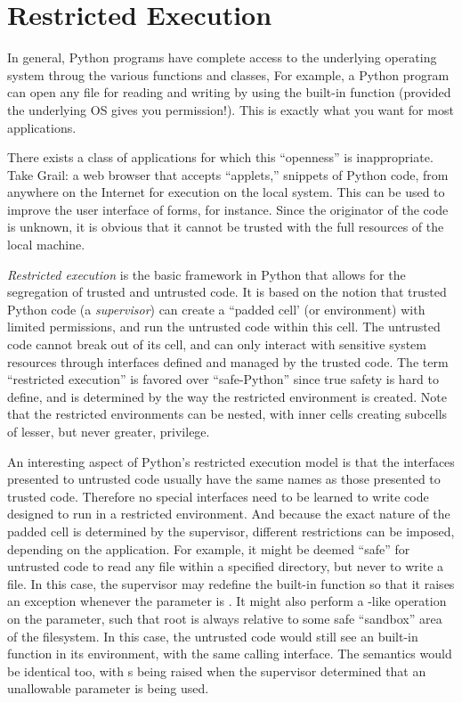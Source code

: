 \chapter{Restricted Execution \label{restricted}}

In general, Python programs have complete access to the underlying
operating system throug the various functions and classes, For
example, a Python program can open any file for reading and writing by
using the  built-in function (provided the underlying
OS gives you permission!).  This is exactly what you want for most
applications.

There exists a class of applications for which this ``openness'' is
inappropriate.  Take Grail: a web browser that accepts ``applets,''
snippets of Python code, from anywhere on the Internet for execution
on the local system.  This can be used to improve the user interface
of forms, for instance.  Since the originator of the code is unknown,
it is obvious that it cannot be trusted with the full resources of the
local machine.

\emph{Restricted execution} is the basic framework in Python that allows
for the segregation of trusted and untrusted code.  It is based on the
notion that trusted Python code (a \emph{supervisor}) can create a
``padded cell' (or environment) with limited permissions, and run the
untrusted code within this cell.  The untrusted code cannot break out
of its cell, and can only interact with sensitive system resources
through interfaces defined and managed by the trusted code.  The term
``restricted execution'' is favored over ``safe-Python''
since true safety is hard to define, and is determined by the way the
restricted environment is created.  Note that the restricted
environments can be nested, with inner cells creating subcells of
lesser, but never greater, privilege.

An interesting aspect of Python's restricted execution model is that
the interfaces presented to untrusted code usually have the same names
as those presented to trusted code.  Therefore no special interfaces
need to be learned to write code designed to run in a restricted
environment.  And because the exact nature of the padded cell is
determined by the supervisor, different restrictions can be imposed,
depending on the application.  For example, it might be deemed
``safe'' for untrusted code to read any file within a specified
directory, but never to write a file.  In this case, the supervisor
may redefine the built-in  function so that it raises
an exception whenever the  parameter is .  It
might also perform a -like operation on the
 parameter, such that root is always relative to some
safe ``sandbox'' area of the filesystem.  In this case, the untrusted
code would still see an built-in  function in its
environment, with the same calling interface.  The semantics would be
identical too, with s being raised when the
supervisor determined that an unallowable parameter is being used.

